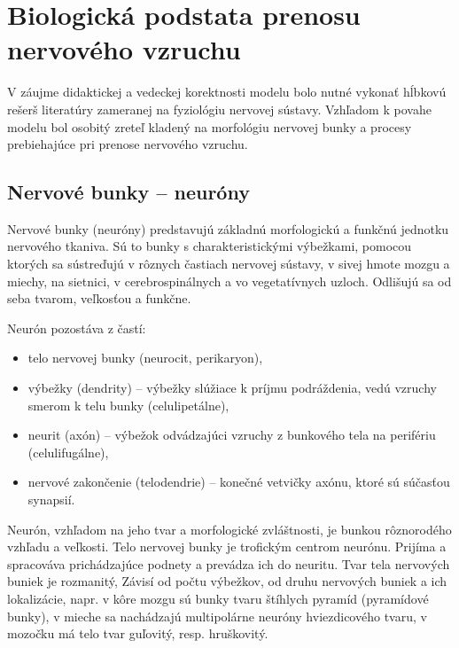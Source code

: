 \section{Biologická podstata prenosu nervového vzruchu}\label{nervova-sustava}
V záujme didaktickej a vedeckej korektnosti modelu bolo nutné vykonať hĺbkovú rešerš literatúry zameranej na fyziológiu nervovej sústavy. Vzhľadom k povahe modelu bol
osobitý zreteľ kladený na morfológiu nervovej bunky a procesy prebiehajúce pri prenose nervového vzruchu.
\subsection{Nervové bunky {--} neuróny}
Nervové bunky (neuróny) predstavujú základnú morfologickú a funkčnú jednotku nervového tkaniva. Sú to bunky s charakteristickými výbežkami, pomocou ktorých sa sústreďujú v rôznych častiach nervovej 
sústavy, v sivej hmote mozgu a miechy, na sietnici, v cerebrospinálnych a vo vegetatívnych uzloch. Odlišujú sa od seba tvarom, veľkosťou a funkčne. 

Neurón pozostáva z častí:
\begin{itemize}
  \item telo nervovej bunky (neurocit, perikaryon),
  \item výbežky (dendrity) {--} výbežky slúžiace k príjmu podráždenia, vedú vzruchy smerom k telu bunky (celulipetálne),
  \item neurit (axón) {--} výbežok odvádzajúci vzruchy z bunkového tela na perifériu (celulifugálne),
  \item nervové zakončenie (telodendrie) {--} konečné vetvičky axónu, ktoré sú súčasťou synapsií.
\end{itemize}
Neurón, vzhľadom na jeho tvar a morfologické zvláštnosti, je bunkou rôznorodého vzhľadu a veľkosti. Telo nervovej bunky je trofickým centrom neurónu. Prijíma a spracováva prichádzajúce podnety a 
prevádza ich do neuritu. Tvar tela nervových buniek je rozmanitý, Závisí od počtu výbežkov, od druhu nervových buniek a ich lokalizácie, napr. v kôre mozgu sú bunky tvaru štíhlych pyramíd (pyramídové bunky),
v mieche sa nachádzajú multipolárne neuróny hviezdicového tvaru, v mozočku má telo tvar guľovitý, resp. hruškovitý. \cite{holecovaAnatomiaMorfologiaZivocichov2016}


